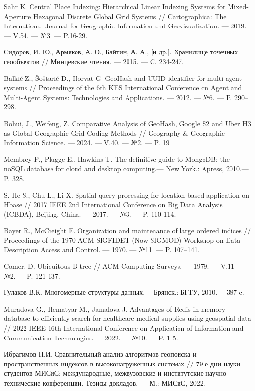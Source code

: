 \begin{thebibliography}{9}
Sahr K. Central Place Indexing: Hierarchical Linear Indexing Systems for Mixed-Aperture Hexagonal Discrete Global Grid Systems // Cartographica: The International Journal for Geographic Information and Geovisualization. --- 2019. --- V.54. --- №3. --- P.16-29.

Сидоров, И. Ю., Армяков, А. О., Байтин, А. А., [и др.]. Хранилище точечных геообъектов // Минцевские чтения. --- 2015. --- C. 234-247.

Balkić Z., Šoštarić D., Horvat G. GeoHash and UUID identifier for multi-agent systems // Proceedings of the 6th KES International Conference on Agent and Multi-Agent Systems: Technologies and Applications. --- 2012. --- №6. --- P. 290–298.

Bohui, J., Weifeng, Z. Comparative Analysis of GeoHash, Google S2 and Uber H3 as Global Geographic Grid Coding Methods // Geography & Geographic Information Science. --- 2024. --- V.40. --- №2. --- P. 19

Membrey P., Plugge E., Hawkins T. The definitive guide to MongoDB: the
noSQL database for cloud and desktop computing.--- New York.: Apress, 2010.--- P. 328.

S. He S., Chu L., Li X. Spatial query processing for location based application on Hbase // 2017 IEEE 2nd International Conference on Big Data Analysis (ICBDA), Beijing, China. --- 2017. --- №3. --- P. 110-114.

Bayer R., McCreight E. Organization and maintenance of large ordered indices // Proceedings of the 1970 ACM SIGFIDET (Now SIGMOD) Workshop on Data Description Access and Control. --- 1970. --- №11. --- P. 107–141.

Comer, D. Ubiquitous B-tree // ACM Computing Surveys. --- 1979. --- V.11 --- №2. --- P. 121-137.

Гулаков В.К. Многомерные структуры данных.--- Брянск.: БГТУ, 2010.--- 387 c.

Muradova G., Hematyar M., Jamalova J. Advantages of Redis in-memory database to efficiently search for healthcare medical supplies using geospatial data // 2022 IEEE 16th International Conference on Application of Information and Communication Technologies. --- 2022. --- №10. --- P. 1-5.

Ибрагимов П.И. Сравнительный анализ алгоритмов геопоиска и пространственных индексов в высоконагруженных системах // 79-е дни науки студентов МИСиС: международные, межвузовские и институтские научно-технические конференции. Тезисы докладов. — М.: МИСиС, 2022. 

\end{thebibliography}

